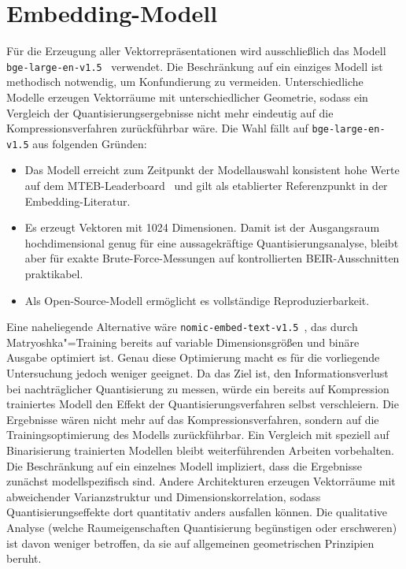 \section{Embedding-Modell}
%
Für die Erzeugung aller Vektorrepräsentationen wird ausschließlich das Modell \texttt{bge-\allowbreak large-\allowbreak en-\allowbreak v1.5}~\cite{xiao_2023_bge} verwendet.
Die Beschränkung auf ein einziges Modell ist methodisch notwendig, um Konfundierung zu vermeiden.
Unterschiedliche Modelle erzeugen Vektorräume mit unterschiedlicher Geometrie, sodass ein Vergleich der Quantisierungsergebnisse nicht mehr eindeutig auf die Kompressionsverfahren zurückführbar wäre.
%
Die Wahl fällt auf \texttt{bge-\allowbreak large-\allowbreak en-\allowbreak v1.5} aus folgenden Gründen:
\begin{itemize}
  \item Das Modell erreicht zum Zeitpunkt der Modellauswahl konsistent hohe Werte auf dem MTEB-Leaderboard~\cite{muennighoff_2022_mteb} und gilt als etablierter Referenzpunkt in der Embedding-Literatur.
  \item Es erzeugt Vektoren mit 1024 Dimensionen.
Damit ist der Ausgangsraum hochdimensional genug für eine aussagekräftige Quantisierungsanalyse, bleibt aber für exakte Brute-Force-Messungen auf kontrollierten BEIR-Ausschnitten praktikabel.
  \item Als Open-Source-Modell ermöglicht es vollständige Reproduzierbarkeit.
\end{itemize}
%
Eine naheliegende Alternative wäre \texttt{nomic-\allowbreak embed-\allowbreak text-\allowbreak v1.5}~\cite{nussbaum_2024_nomic}, das durch Matryoshka"=Training bereits auf variable Dimensionsgrößen und binäre Ausgabe optimiert ist.
Genau diese Optimierung macht es für die vorliegende Untersuchung jedoch weniger geeignet.
Da das Ziel ist, den Informationsverlust bei nachträglicher Quantisierung zu messen, würde ein bereits auf Kompression trainiertes Modell den Effekt der Quantisierungsverfahren selbst verschleiern.
Die Ergebnisse wären nicht mehr auf das Kompressionsverfahren, sondern auf die Trainingsoptimierung des Modells zurückführbar.
Ein Vergleich mit speziell auf Binarisierung trainierten Modellen bleibt weiterführenden Arbeiten vorbehalten.
%
Die Beschränkung auf ein einzelnes Modell impliziert, dass die Ergebnisse zunächst modellspezifisch sind.
Andere Architekturen erzeugen Vektorräume mit abweichender Varianzstruktur und Dimensionskorrelation, sodass Quantisierungseffekte dort quantitativ anders ausfallen können.
Die qualitative Analyse (welche Raumeigenschaften Quantisierung begünstigen oder erschweren) ist davon weniger betroffen, da sie auf allgemeinen geometrischen Prinzipien beruht.
%
